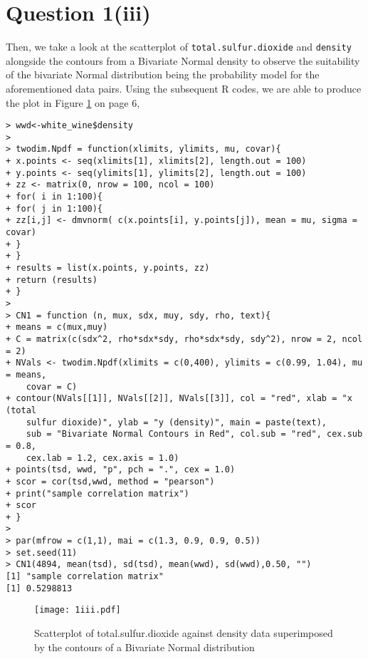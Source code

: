 \documentclass[11pt,a4]{article}
\begin{document}
\bigskip

\section{Question 1(iii)}
Then, we take a look at the scatterplot of \verb|total.sulfur.dioxide| and \verb|density| alongside the contours from a Bivariate Normal density to observe the suitability of the bivariate Normal distribution being the probability model for the aforementioned data pairs. Using the subsequent R codes, we are able to produce the plot in Figure \ref{fig3} on page 6,

\begin{verbatim}
> wwd<-white_wine$density
> 
> twodim.Npdf = function(xlimits, ylimits, mu, covar){
+ x.points <- seq(xlimits[1], xlimits[2], length.out = 100)
+ y.points <- seq(ylimits[1], ylimits[2], length.out = 100)
+ zz <- matrix(0, nrow = 100, ncol = 100)
+ for( i in 1:100){
+ for( j in 1:100){
+ zz[i,j] <- dmvnorm( c(x.points[i], y.points[j]), mean = mu, sigma = covar)
+ }
+ }
+ results = list(x.points, y.points, zz)
+ return (results)
+ }
> 
> CN1 = function (n, mux, sdx, muy, sdy, rho, text){
+ means = c(mux,muy)
+ C = matrix(c(sdx^2, rho*sdx*sdy, rho*sdx*sdy, sdy^2), nrow = 2, ncol = 2)
+ NVals <- twodim.Npdf(xlimits = c(0,400), ylimits = c(0.99, 1.04), mu = means, 
    covar = C)
+ contour(NVals[[1]], NVals[[2]], NVals[[3]], col = "red", xlab = "x (total 
    sulfur dioxide)", ylab = "y (density)", main = paste(text), 
    sub = "Bivariate Normal Contours in Red", col.sub = "red", cex.sub = 0.8, 
    cex.lab = 1.2, cex.axis = 1.0)
+ points(tsd, wwd, "p", pch = ".", cex = 1.0)
+ scor = cor(tsd,wwd, method = "pearson")
+ print("sample correlation matrix")
+ scor
+ }
> 
> par(mfrow = c(1,1), mai = c(1.3, 0.9, 0.9, 0.5))
> set.seed(11)
> CN1(4894, mean(tsd), sd(tsd), mean(wwd), sd(wwd),0.50, "")
[1] "sample correlation matrix"
[1] 0.5298813
\end{verbatim}

\begin{figure}[hbt!]
    \centering
    \texttt{[image: 1iii.pdf]}
    \caption{Scatterplot of total.sulfur.dioxide against density data superimposed by the contours of a Bivariate Normal distribution}
    \label{fig3}
\end{figure}
\end{document}
